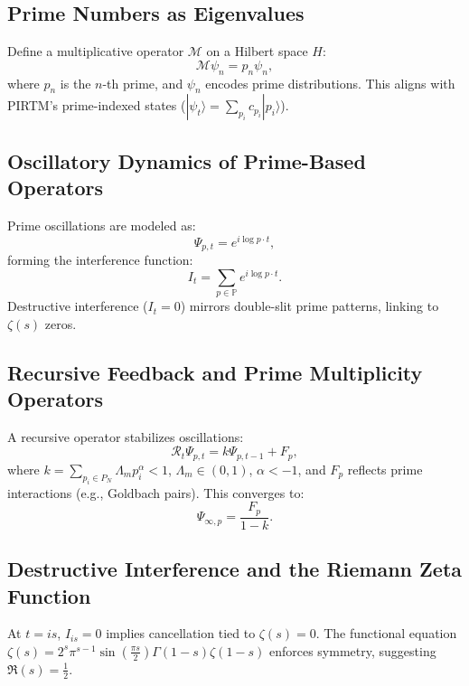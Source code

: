 \documentclass[11pt]{article}
\theoremstyle{plain}
\begin{document}
\subsection{Prime Numbers as Eigenvalues}
Define a multiplicative operator \( \mathcal{M} \) on a Hilbert space \( H \):
\begin{equation}
    \mathcal{M} \psi_n = p_n \psi_n,
\end{equation}
where \( p_n \) is the \( n \)-th prime, and \( \psi_n \) encodes prime distributions. This aligns with PIRTM’s prime-indexed states (\( |\psi_t\rangle = \sum_{p_i} c_{p_i} |p_i\rangle \)).

\subsection{Oscillatory Dynamics of Prime-Based Operators}
Prime oscillations are modeled as:
\begin{equation}
    \Psi_{p,t} = e^{i \log p \cdot t},
\end{equation}
forming the interference function:
\begin{equation}
    I_t = \sum_{p \in \mathbb{P}} e^{i \log p \cdot t}.
\end{equation}
Destructive interference (\( I_t = 0 \)) mirrors double-slit prime patterns, linking to \( \zeta(s) \) zeros.

\subsection{Recursive Feedback and Prime Multiplicity Operators}
A recursive operator stabilizes oscillations:
\begin{equation}
    \mathcal{R}_t \Psi_{p,t} = k \Psi_{p,t-1} + F_p,
\end{equation}
where \( k = \sum_{p_i \in P_N} \Lambda_m p_i^\alpha < 1 \), \( \Lambda_m \in (0,1) \), \( \alpha < -1 \), and \( F_p \) reflects prime interactions (e.g., Goldbach pairs). This converges to:
\begin{equation}
    \Psi_{\infty,p} = \frac{F_p}{1 - k}.
\end{equation}

\subsection{Destructive Interference and the Riemann Zeta Function}
At \( t = i s \), \( I_{is} = 0 \) implies cancellation tied to \( \zeta(s) = 0 \). The functional equation \( \zeta(s) = 2^s \pi^{s-1} \sin\left(\frac{\pi s}{2}\right) \Gamma(1-s) \zeta(1-s) \) enforces symmetry, suggesting \( \Re(s) = \frac{1}{2} \).
\end{document}
